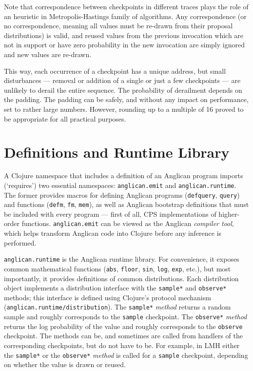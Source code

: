 \documentclass[preprint]{sigplanconf}
\begin{document}
Note that correspondence between checkpoints in different
traces plays the role of an heuristic in Metropolis-Hastings
family of algorithms. Any correspondence (or no correspondence,
meaning all values must be re-drawn from their proposal
distributions) is valid, and reused values from the previous
invocation which are not in support or have zero probability in
the new invocation are simply ignored and new values are
re-drawn.

This way, each occurrence of a checkpoint has a unique address,
but small disturbances --- removal or addition of a single or just
a few checkpoints --- are unlikely to derail the entire sequence.
The probability of derailment depends on the padding. The
padding can be safely, and without any impact on performance,
set to rather large numbers. However, rounding up to a multiple
of 16 proved to be appropriate for all practical purposes.
\iftoggle{full}{%

Function \texttt{checkpoint-id} in the
\texttt{anglican.inference} namespace automates generation of
checkpoint addresses and can be used from any inference
algorithm.
}{%
}%

\section{Definitions and Runtime Library}
\label{seq:runtime}

A Clojure namespace that includes a definition of an Anglican
program imports (`requires') two essential namespaces:
\texttt{anglican.emit} and \texttt{anglican.runtime}. The former
provides macros for defining Anglican programs
(\texttt{defquery}, \texttt{query}) and functions
(\texttt{defm}, \texttt{fm}, \texttt{mem}), as well as Anglican
bootstrap definitions that must be included with every program
--- first of all, CPS implementations of higher-order functions.
\texttt{anglican.emit} can be viewed as the Anglican
\textit{compiler tool}, which helps transform Anglican code into
Clojure before any inference is performed.

\texttt{anglican.runtime} is the Anglican runtime library. For
convenience, it exposes common mathematical functions
(\texttt{abs}, \texttt{floor}, \texttt{sin}, \texttt{log},
\texttt{exp}, etc.), but most importantly, it provides
definitions of common distributions. Each distribution object implements a
distribution interface with the \texttt{sample*} and \texttt{observe*} methods;
this interface is defined using Clojure's protocol mechanism
(\texttt{anglican.{\linebreak[0]}runtime/{\linebreak[0]}distribution}).
The \texttt{sample*} \textit{method} returns a random sample and
roughly corresponds to the \texttt{sample} checkpoint.
The \texttt{observe*} \textit{method} returns the log probability
of the value and roughly corresponds to the \texttt{observe}
checkpoint. The methods can be, and sometimes are called from
handlers of the corresponding checkpoints, but do not have to
be. For example, in LMH either the \texttt{sample*} or
the \texttt{observe*} \textit{method} is called for a
\texttt{sample} checkpoint, depending on whether the value is
drawn or reused.
\end{document}
